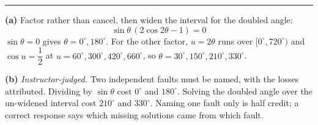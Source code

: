 \documentclass[12pt]{article}
\begin{document}
\vspace{0.12cm}\noindent\rule{\linewidth}{0.2pt}\vspace{0.12cm}

\problem{$2\sin\theta\cos 2\theta = \sin\theta$ on $0^\circ \le \theta < 360^\circ$. Student cancelled $\sin\theta$, used $2\theta \in [0^\circ, 360^\circ)$, and reported $30^\circ, 150^\circ$.}

\textbf{(a)} Factor rather than cancel, then widen the interval for the doubled angle:
\[ \sin\theta\,(2\cos 2\theta - 1) = 0 \]
$\sin\theta = 0$ gives $\theta = 0^\circ, 180^\circ$. For the other factor, $u = 2\theta$ runs over $[0^\circ, 720^\circ)$ and $\cos u = \dfrac{1}{2}$ at $u = 60^\circ, 300^\circ, 420^\circ, 660^\circ$, so $\theta = 30^\circ, 150^\circ, 210^\circ, 330^\circ$. 

\textbf{(b)} \emph{Instructor-judged.} Two independent faults must be named, with the losses attributed. Dividing by $\sin\theta$ cost $0^\circ$ and $180^\circ$. Solving the doubled angle over the un-widened interval cost $210^\circ$ and $330^\circ$. Naming one fault only is half credit; a correct response says which missing solutions came from which fault.
\end{document}
